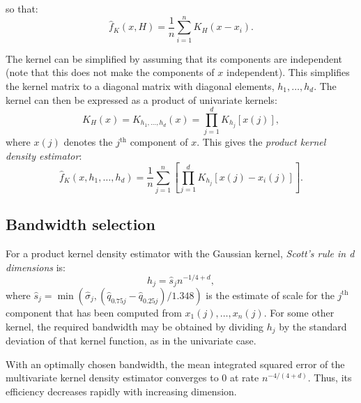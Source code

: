 so that:
\begin{equation}
\hat{f}_K(x,H)=\frac{1}{n}\sum^n_{i=1}K_H(x-x_i).
\end{equation}

The kernel can be simplified by assuming that its components are independent (note that this does not make the components of $x$ independent). This simplifies the kernel matrix to a diagonal matrix with diagonal elements, $h_1,\ldots,h_d$. The kernel can then be expressed as a product of univariate kernels:
\begin{equation}
K_H(x)=K_{h_1,\ldots,h_d}(x)=\prod^d_{j=1}K_{h_j}[x(j)],
\end{equation}
where $x(j)$ denotes the $j^{\textrm{th}}$ component of $x$. This gives the {\it product kernel density estimator}:
\begin{equation}
\hat{f}_K(x,h_1,\ldots,h_d)=\frac{1}{n}\sum^n_{j=1}[\prod^d_{j=1}K_{h_j}[x(j)-x_i(j)]].
\end{equation}

\subsection{Bandwidth selection}
For a product kernel density estimator with the Gaussian kernel, {\it Scott's rule in d dimensions} is:
\begin{equation}
h_j=\hat{s}_jn^{-1/4+d},
\end{equation}
where $\hat{s}_j=\min(\hat{\sigma}_j,(\hat{q}_{0.75j}-\hat{q}_{0.25j})/1.348)$ is the estimate of scale for the $j^{\textrm{th}}$ component that has been computed from $x_1(j),\ldots,x_n(j)$. For some other kernel, the required bandwidth may be obtained by dividing $h_j$ by the standard deviation of that kernel function, as in the univariate case.

With an optimally chosen bandwidth, the mean integrated squared error of the multivariate kernel density estimator converges to 0 at rate $n^{-4/(4+d)}$. Thus, its efficiency decreases rapidly with increasing dimension.

